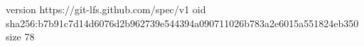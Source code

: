 version https://git-lfs.github.com/spec/v1
oid sha256:b7b91c7d14d6076d2b962739e544394a090711026b783a2e6015a551824eb350
size 78

